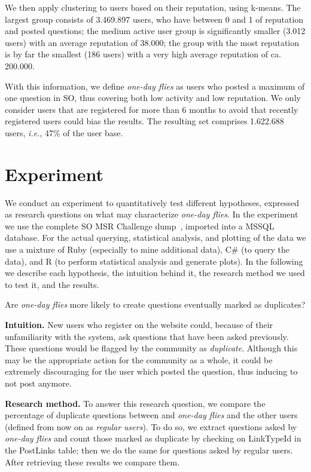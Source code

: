 \documentclass[conference]{IEEEtran}
\newcommand{\ie}{\emph{i.e.},\xspace}
\newcommand\odf{\emph{one-day flies}\xspace}
\newcommand\ru{regular users\xspace}
\begin{document}
We then apply clustering to users based on their reputation, using k-means.
The largest group consists of 3.469.897 users, who have between 0 and 1 of
reputation and posted questions; the medium active user group is significantly
smaller (3.012 users) with an average reputation of 38.000;  the group with the
most reputation is by far the smallest (186 users) with a very high average
reputation of ca. 200.000.

With this information, we define \odf as users who posted a maximum of one
question in SO, thus covering both low activity and low reputation. We only
consider users that are registered for more than 6 months to avoid that
recently registered users could bias the results. The resulting set comprises
1.622.688 users, \ie 47\% of the user base. 



\section{Experiment}

We conduct an experiment to quantitatively test different hypotheses, expressed
as research questions on what may characterize \odf. In the experiment we use
the complete SO MSR Challenge dump~\cite{MSRChallenge2015}, imported into a
MSSQL database. For the actual querying, statistical analysis, and plotting of
the data we use a mixture of Ruby (especially to mine additional data), C\# (to
query the data), and R (to perform statistical analysis and generate plots).
In the following we describe each hypothesis, the intuition behind it, the
research method we used to test it, and the results.\\

\begin{tcolorbox}[size=fbox,title=RQ1: Duplicate Questions]
Are \odf more likely to create questions eventually marked as duplicates?
\end{tcolorbox}

\textbf{Intuition.} New users who register on
the website could, because of their unfamiliarity with the system, ask
questions that have been asked previously. These questions would be flagged
by the community as \textit{duplicate}. Although this may be the appropriate
action for the community as a whole, it could be extremely discouraging for the
user which posted the question, thus inducing to not post anymore. 

\textbf{Research method.} To answer this research question, we compare the
percentage of duplicate questions  between and \odf and the other users
(defined from now on as \emph{\ru}). To do so, we
extract questions asked by \odf and count those marked as duplicate by checking
on  LinkTypeId in the PostLinks table; then we do the same for questions asked
by \ru. After retrieving these results we compare them.
\end{document}
